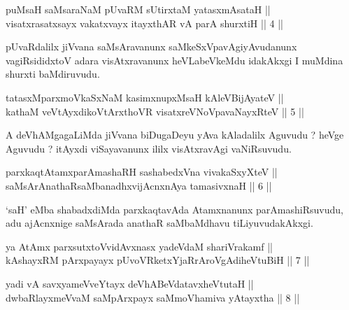 \begin{shl}
puMsaH saMsaraNaM pUvaRM sUtirxtaM yatasxmAsataH || \\
visatxrasatxsayx vakatxvayx itayxthAR vA parA shurxtiH \hfill || 4 ||
  
\end{shl}

\begin{artha}
pUvaRdalilx jiVvana saMsAravanunx saMkeSxVpavAgiyAvudanunx
vagiRsididxtoV adara visAtxravanunx heVLabeVkeMdu idakAkxgi I muMdina
shurxti baMdiruvudu.
\end{artha}

\begin{shl}
tatasxMparxmoVkaSxNaM kasimxnupxMsaH kAleV\s BijAyateV || \\
kathaM veVtAyxdikoV\s tArxthoVR visatxreVNoVpavaNayxRteV \hfill || 5 ||
  
\end{shl}

\begin{artha}
A deVhAMgagaLiMda jiVvana biDugaDeyu yAva kAladalilx Aguvudu ? heVge
Aguvudu ? itAyxdi viSayavanunx ililx visAtxravAgi vaNiRsuvudu.
\end{artha}

\begin{shl}
parxkaqtAtamxparAmashaRH sashabedxVna vivakaSxyXteV || \\
saMsArAnathaRsaMbanadhxvijAcnxnAya tamasivxnaH \hfill || 6 ||
  
\end{shl}

\begin{artha}
`saH' eMba shabadxdiMda parxkaqtavAda Atamxnanunx parAmashiRsuvudu,
adu ajAcnxnige saMsArada anathaR saMbaMdhavu tiLiyuvudakAkxgi.
\end{artha}

\begin{shl}
ya AtAmx parxsutxtoV\s vidAvxnasx yadeVdaM shariVrakamf || \\
kAshayxRM pArxpayayx pUvoVRketxYjaRrAroVgAdiheVtuBiH \hfill || 7 ||
  
\end{shl}

\begin{shl}
yadi vA savxyameVveYtayx deVhABeVdatavxheVtutaH || \\
dwbaRlayxmeVvaM saMpArxpayx saMmoVhamiva yAtayxtha \hfill || 8 ||
  
\end{shl}

